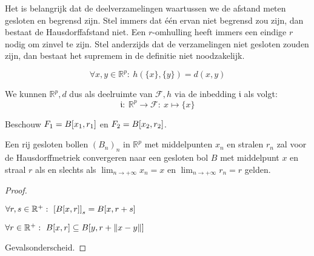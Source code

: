 \documentclass[main.tex]{subfiles}
\begin{document}
\begin{opm}
  Het is belangrijk dat de deelverzamelingen waartussen we de afstand meten gesloten en begrensd zijn.
  Stel immers dat \'e\'en ervan niet begrensd zou zijn, dan bestaat de Hausdorffafstand niet.
  Een $r$-omhulling heeft immers een eindige $r$ nodig om zinvel te zijn.
  Stel anderzijds dat de verzamelingen niet gesloten zouden zijn, dan bestaat het supremem in de definitie niet noodzakelijk.
\end{opm}

\begin{st}
  \label{st:rp-als-deel-van-f}
  \[ \forall x,y \in \mathbb{R}^{p}:\ h(\{x\},\{y\}) = d(x,y) \]
\end{st}

\begin{opm}
  We kunnen $\mathbb{R}^{p},d$ dus als deelruimte van $\mathcal{F},h$ via de inbedding $\mathfrak{i}$ als volgt:
  \[ \mathfrak{i}:\ \mathbb{R}^{p} \rightarrow \mathcal{F}:\ x \mapsto \{x\} \]
\end{opm}

\begin{vb}
  Beschouw $F_{1} = B\interval{x_{1}}{r_{1}}$ en $F_{2}= B\interval{x_{2}}{r_{2}}$.

\end{vb}


\begin{st}
  Een rij gesloten bollen $(B_{n})_{n}$ in $\mathbb{R}^{p}$ met middelpunten $x_{n}$ en stralen $r_{n}$ zal voor de Hausdorffmetriek convergeren naar een gesloten bol $B$ met middelpunt $x$ en straal $r$ als en slechts als $\lim_{n\rightarrow +\infty}x_{n}=x$ en $\lim_{n\rightarrow +\infty}r_{n} = r$ gelden.
\begin{klad}
\begin{proof}
  \begin{lem}
    $\forall r,s \in \mathbb{R}^{+}:\ \left[B\interval{x}{r}\right]_{s} = B\interval{x}{r+s}$
  \end{lem}

  \begin{lem}
    $\forall r\in \mathbb{R}^{+}:\ B\interval{x}{r} \subseteq B\interval{y}{r+\|x-y\|}$
  \end{lem}
  Gevalsonderscheid.
\end{proof}
\end{klad}
\end{st}
\end{document}
